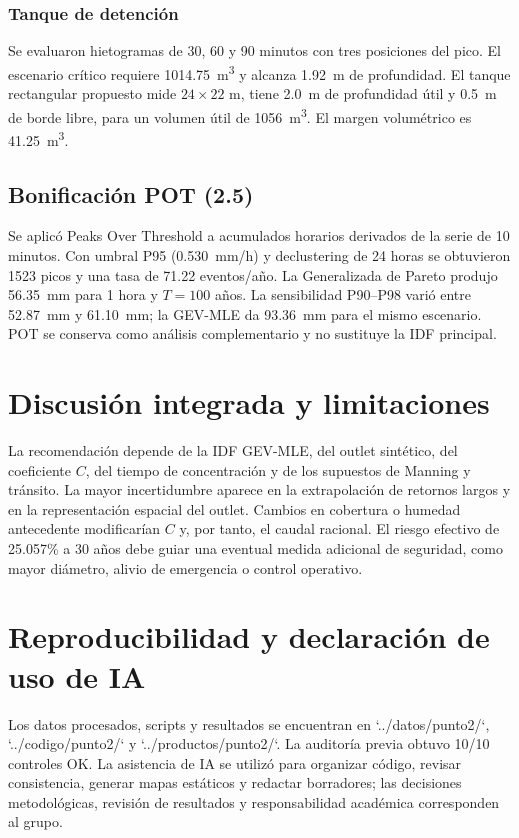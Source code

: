 \documentclass[man]{apa7}
\begin{document}
\subsubsection{Tanque de detención}
Se evaluaron hietogramas de 30, 60 y 90 minutos con tres posiciones del pico. El escenario crítico requiere \SI{1014.75}{m^3} y alcanza \SI{1.92}{m} de profundidad. El tanque rectangular propuesto mide $24\times22$ m, tiene \SI{2.0}{m} de profundidad útil y \SI{0.5}{m} de borde libre, para un volumen útil de \SI{1056}{m^3}. El margen volumétrico es \SI{41.25}{m^3}.

\subsection{Bonificación POT (2.5)}
Se aplicó Peaks Over Threshold a acumulados horarios derivados de la serie de 10 minutos. Con umbral P95 (\SI{0.530}{mm/h}) y declustering de 24 horas se obtuvieron 1523 picos y una tasa de 71.22 eventos/año. La Generalizada de Pareto produjo \SI{56.35}{mm} para 1 hora y $T=100$ años. La sensibilidad P90--P98 varió entre \SI{52.87}{mm} y \SI{61.10}{mm}; la GEV-MLE da \SI{93.36}{mm} para el mismo escenario. POT se conserva como análisis complementario y no sustituye la IDF principal.

\section{Discusión integrada y limitaciones}
La recomendación depende de la IDF GEV-MLE, del outlet sintético, del coeficiente $C$, del tiempo de concentración y de los supuestos de Manning y tránsito. La mayor incertidumbre aparece en la extrapolación de retornos largos y en la representación espacial del outlet. Cambios en cobertura o humedad antecedente modificarían $C$ y, por tanto, el caudal racional. El riesgo efectivo de 25.057\% a 30 años debe guiar una eventual medida adicional de seguridad, como mayor diámetro, alivio de emergencia o control operativo.

\section{Reproducibilidad y declaración de uso de IA}
Los datos procesados, scripts y resultados se encuentran en `../datos/punto2/`, `../codigo/punto2/` y `../productos/punto2/`. La auditoría previa obtuvo 10/10 controles OK. La asistencia de IA se utilizó para organizar código, revisar consistencia, generar mapas estáticos y redactar borradores; las decisiones metodológicas, revisión de resultados y responsabilidad académica corresponden al grupo.
\end{document}
